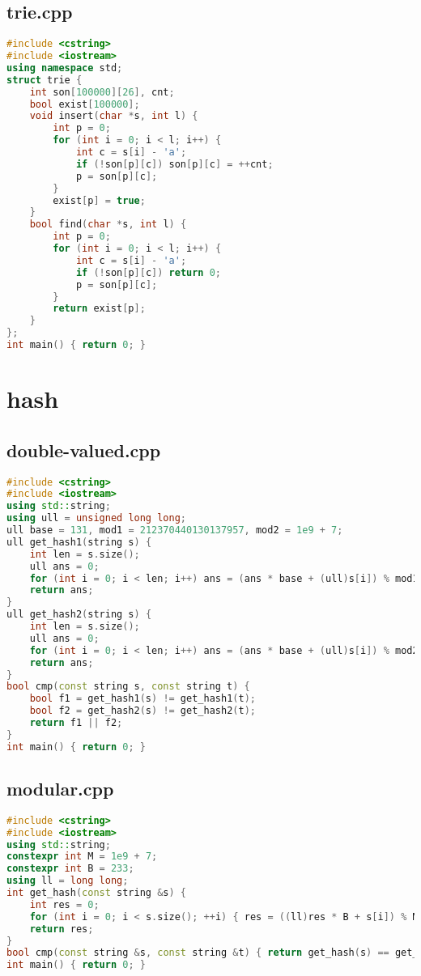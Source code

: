 \documentclass[9pt, a4paper, oneside]{book}
\begin{document}
\subsection{trie.cpp}
\begin{lstlisting}[language={C++}]
#include <cstring>
#include <iostream>
using namespace std;
struct trie {
    int son[100000][26], cnt;
    bool exist[100000];
    void insert(char *s, int l) {
        int p = 0;
        for (int i = 0; i < l; i++) {
            int c = s[i] - 'a';
            if (!son[p][c]) son[p][c] = ++cnt;
            p = son[p][c];
        }
        exist[p] = true;
    }
    bool find(char *s, int l) {
        int p = 0;
        for (int i = 0; i < l; i++) {
            int c = s[i] - 'a';
            if (!son[p][c]) return 0;
            p = son[p][c];
        }
        return exist[p];
    }
};
int main() { return 0; }\end{lstlisting}
\section{hash}
\subsection{double-valued.cpp}
\begin{lstlisting}[language={C++}]
#include <cstring>
#include <iostream>
using std::string;
using ull = unsigned long long;
ull base = 131, mod1 = 212370440130137957, mod2 = 1e9 + 7;
ull get_hash1(string s) {
    int len = s.size();
    ull ans = 0;
    for (int i = 0; i < len; i++) ans = (ans * base + (ull)s[i]) % mod1;
    return ans;
}
ull get_hash2(string s) {
    int len = s.size();
    ull ans = 0;
    for (int i = 0; i < len; i++) ans = (ans * base + (ull)s[i]) % mod2;
    return ans;
}
bool cmp(const string s, const string t) {
    bool f1 = get_hash1(s) != get_hash1(t);
    bool f2 = get_hash2(s) != get_hash2(t);
    return f1 || f2;
}
int main() { return 0; }\end{lstlisting}
\subsection{modular.cpp}
\begin{lstlisting}[language={C++}]
#include <cstring>
#include <iostream>
using std::string;
constexpr int M = 1e9 + 7;
constexpr int B = 233;
using ll = long long;
int get_hash(const string &s) {
    int res = 0;
    for (int i = 0; i < s.size(); ++i) { res = ((ll)res * B + s[i]) % M; }
    return res;
}
bool cmp(const string &s, const string &t) { return get_hash(s) == get_hash(t); }
int main() { return 0; }\end{lstlisting}
\end{document}
